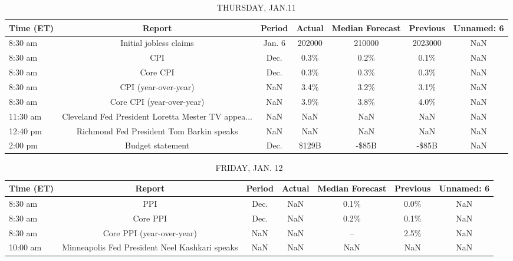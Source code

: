 \documentclass{article}%
\begin{document}
%


\begin{table}[htbp]%
\caption{THURSDAY, JAN.11}%
\centering%
\begin{adjustbox}{width=1\textwidth}%
\begin{tabular}{lcccccc}
\toprule
Time (ET) &                                             Report & Period & Actual & Median Forecast & Previous & Unnamed: 6 \\
\midrule
  8:30 am &                             Initial jobless claims & Jan. 6 & 202000 &          210000 &  2023000 &        NaN \\
  8:30 am &                                                CPI &   Dec. &   0.3\% &            0.2\% &     0.1\% &        NaN \\
  8:30 am &                                           Core CPI &   Dec. &   0.3\% &            0.3\% &     0.3\% &        NaN \\
  8:30 am &                               CPI (year-over-year) &    NaN &   3.4\% &            3.2\% &     3.1\% &        NaN \\
  8:30 am &                          Core CPI (year-over-year) &    NaN &   3.9\% &            3.8\% &     4.0\% &        NaN \\
 11:30 am & Cleveland Fed President Loretta Mester TV appea... &    NaN &    NaN &             NaN &      NaN &        NaN \\
 12:40 pm &           Richmond Fed President Tom Barkin speaks &    NaN &    NaN &             NaN &      NaN &        NaN \\
  2:00 pm &                                   Budget statement &   Dec. &  \$129B &           -\$85B &    -\$85B &        NaN \\
\bottomrule
\end{tabular}
%
\end{adjustbox}%
\end{table}

%


\begin{table}[htbp]%
\caption{FRIDAY, JAN. 12}%
\centering%
\begin{adjustbox}{width=1\textwidth}%
\begin{tabular}{lcccccc}
\toprule
Time (ET) &                                         Report & Period & Actual & Median Forecast & Previous & Unnamed: 6 \\
\midrule
  8:30 am &                                            PPI &   Dec. &    NaN &            0.1\% &     0.0\% &        NaN \\
  8:30 am &                                       Core PPI &   Dec. &    NaN &            0.2\% &     0.1\% &        NaN \\
  8:30 am &                      Core PPI (year-over-year) &    NaN &    NaN &              -- &     2.5\% &        NaN \\
 10:00 am & Minneapolis Fed President Neel Kashkari speaks &    NaN &    NaN &             NaN &      NaN &        NaN \\
\bottomrule
\end{tabular}
%
\end{adjustbox}%
\end{table}
\end{document}

